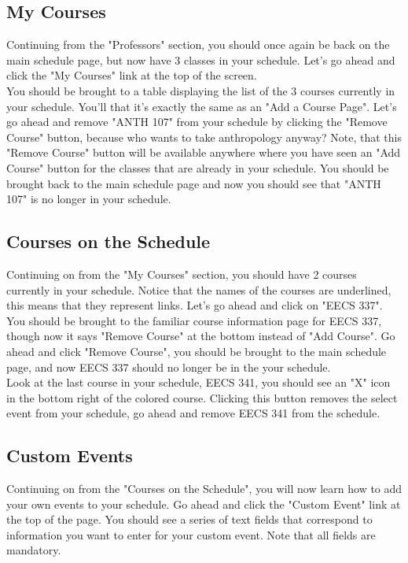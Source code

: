\documentclass[pdftex,12pt,letter]{article}
\begin{document}
\subsection{My Courses}
Continuing from the "Professors" section, you should once again be back on the main schedule page, but now have 3 classes in your schedule. Let's go ahead and click the "My Courses" link at the top of the screen.\\

You should be brought to a table displaying the list of the 3 courses currently in your schedule. You'll that it's exactly the same as an "Add a Course Page". Let's go ahead and remove "ANTH 107" from your schedule by clicking the "Remove Course" button, because who wants to take anthropology anyway? Note, that this "Remove Course" button will be available anywhere where you have seen an "Add Course" button for the classes that are already in your schedule. You should be brought back to the main schedule page and now you should see that "ANTH 107" is no longer in your schedule.\\

\subsection{Courses on the Schedule}
Continuing on from the "My Courses" section, you should have 2 courses currently in your schedule. Notice that the names of the courses are underlined, this means that they represent links. Let's go ahead and click on "EECS 337". You should be brought to the familiar course information page for EECS 337, though now it says "Remove Course" at the bottom instead of "Add Course". Go ahead and click "Remove Course", you should be brought to the main schedule page, and now EECS 337 should no longer be in the your schedule.\\

Look at the last course in your schedule, EECS 341, you should see an "X" icon in the bottom right of the colored course. Clicking this button removes the select event from your schedule, go ahead and remove EECS 341 from the schedule.

\subsection{Custom Events}
Continuing on from the "Courses on the Schedule", you will now learn how to add your own events to your schedule. Go ahead and click the "Custom Event" link at the top of the page. You should see a series of text fields that correspond to information you want to enter for your custom event. Note that all fields are mandatory.\\
\end{document}
